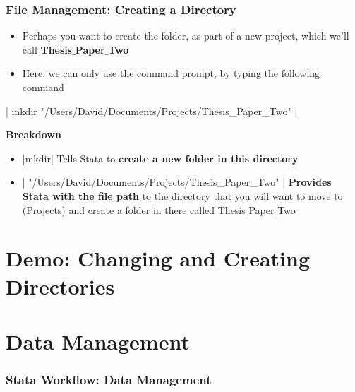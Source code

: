 \documentclass[10pt, compress]{beamer}
\begin{document}
\begin{frame}[fragile]
\frametitle{File Management: Creating a Directory}
\begin{itemize}
\item Perhaps you want to create the folder, as part of a new project, which we'll call \textbf{Thesis$\_$Paper$\_$Two}
\item Here, we can only use the command prompt, by typing the following command
\end{itemize}
\begin{center}
| mkdir "/Users/David/Documents/Projects/Thesis_Paper_Two" |
\end{center}
\textbf{Breakdown}
\begin{itemize}
\item {}|mkdir| Tells Stata to \textbf{create a new folder in this directory}
\item {}| "/Users/David/Documents/Projects/Thesis_Paper_Two" | \textbf{Provides Stata with the file path} to the directory that you will want to move to (\alert{Projects}) and create a folder in there called \alert{Thesis$\_$Paper$\_$Two}
\end{itemize}
\end{frame}

\section{Demo: Changing and Creating Directories}

\section{Data Management}

\begin{frame}[fragile]
\frametitle{Stata Workflow: Data Management}
\begin{center}
\usetikzlibrary{shapes.geometric} %
\end{center}	
\end{frame}
\end{document}
